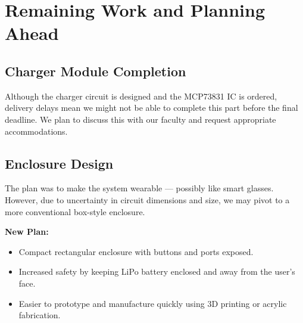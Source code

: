 \chapter{Remaining Work and Planning Ahead}

\section{Charger Module Completion}

Although the charger circuit is designed and the MCP73831 IC is ordered, delivery delays mean we might not be able to complete this part before the final deadline. We plan to discuss this with our faculty and request appropriate accommodations.

\section{Enclosure Design}

The plan was to make the system wearable — possibly like smart glasses. However, due to uncertainty in circuit dimensions and size, we may pivot to a more conventional box-style enclosure.

\textbf{New Plan:}
\begin{itemize}
    \item Compact rectangular enclosure with buttons and ports exposed.
    \item Increased safety by keeping LiPo battery enclosed and away from the user’s face.
    \item Easier to prototype and manufacture quickly using 3D printing or acrylic fabrication.
\end{itemize}

